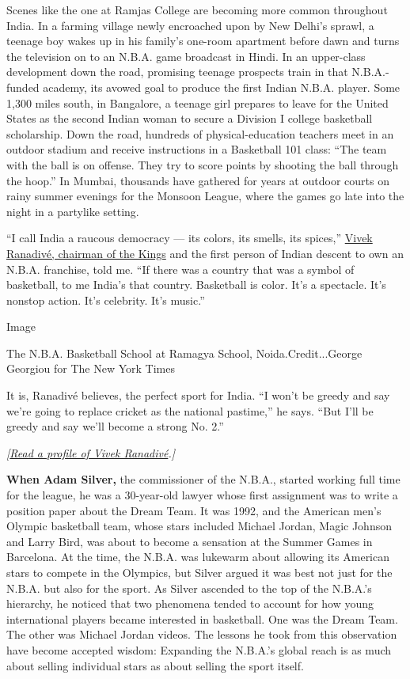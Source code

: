 Scenes like the one at Ramjas College are becoming more common
throughout India. In a farming village newly encroached upon by New
Delhi's sprawl, a teenage boy wakes up in his family's one-room
apartment before dawn and turns the television on to an N.B.A. game
broadcast in Hindi. In an upper-class development down the road,
promising teenage prospects train in that N.B.A.-funded academy, its
avowed goal to produce the first Indian N.B.A. player. Some 1,300 miles
south, in Bangalore, a teenage girl prepares to leave for the United
States as the second Indian woman to secure a Division I college
basketball scholarship. Down the road, hundreds of physical-education
teachers meet in an outdoor stadium and receive instructions in a
Basketball 101 class: ``The team with the ball is on offense. They try
to score points by shooting the ball through the hoop.'' In Mumbai,
thousands have gathered for years at outdoor courts on rainy summer
evenings for the Monsoon League, where the games go late into the night
in a partylike setting.

``I call India a raucous democracy --- its colors, its smells, its
spices,''
\href{https://www.nytimes3xbfgragh.onion/2019/10/03/sports/vivek-ranadive-sacramento-kings.html}{Vivek
Ranadivé, chairman of the Kings} and the first person of Indian descent
to own an N.B.A. franchise, told me. ``If there was a country that was a
symbol of basketball, to me India's that country. Basketball is color.
It's a spectacle. It's nonstop action. It's celebrity. It's music.''

Image

The N.B.A. Basketball School at Ramagya School, Noida.Credit...George
Georgiou for The New York Times

It is, Ranadivé believes, the perfect sport for India. ``I won't be
greedy and say we're going to replace cricket as the national pastime,''
he says. ``But I'll be greedy and say we'll become a strong No. 2.''

\emph{{[}}\href{https://www.nytimes3xbfgragh.onion/2019/10/03/sports/vivek-ranadive-sacramento-kings.html}{\emph{Read
a profile of Vivek Ranadivé}}\emph{.{]}}

\textbf{When Adam Silver,} the commissioner of the N.B.A., started
working full time for the league, he was a 30-year-old lawyer whose
first assignment was to write a position paper about the Dream Team. It
was 1992, and the American men's Olympic basketball team, whose stars
included Michael Jordan, Magic Johnson and Larry Bird, was about to
become a sensation at the Summer Games in Barcelona. At the time, the
N.B.A. was lukewarm about allowing its American stars to compete in the
Olympics, but Silver argued it was best not just for the N.B.A. but also
for the sport. As Silver ascended to the top of the N.B.A.'s hierarchy,
he noticed that two phenomena tended to account for how young
international players became interested in basketball. One was the Dream
Team. The other was Michael Jordan videos. The lessons he took from this
observation have become accepted wisdom: Expanding the N.B.A.'s global
reach is as much about selling individual stars as about selling the
sport itself.


